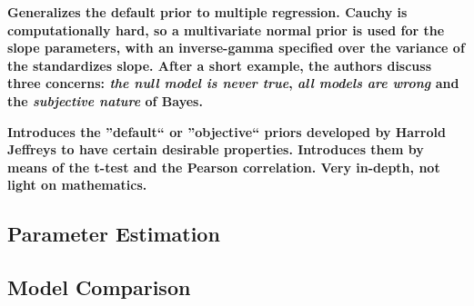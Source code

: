 \documentclass[12pt]{scrartcl}
\begin{document}
\begin{description}
  \textbf{Generalizes the default prior to multiple regression. Cauchy is computationally hard, so a multivariate normal prior is used for the slope parameters, with an inverse-gamma specified over the variance of the standardizes slope. After a short example, the authors discuss three concerns: \emph{the null model is never true}, \emph{all models are wrong} and the \emph{subjective nature} of Bayes.}
  
  \item {}
  
  \item {}
  
  \item {}
  
  \textbf{Introduces the ''default`` or ''objective`` priors developed by Harrold Jeffreys to have certain desirable properties. Introduces them by means of the t-test and the Pearson correlation. Very in-depth, not light on mathematics.}
  

\end{description}


\subsection{Parameter Estimation}
\begin{description}
  \item {}
  
  \item {}
\end{description}


\subsection{Model Comparison}
\begin{description}
  \item {}
\end{description}
\end{document}
